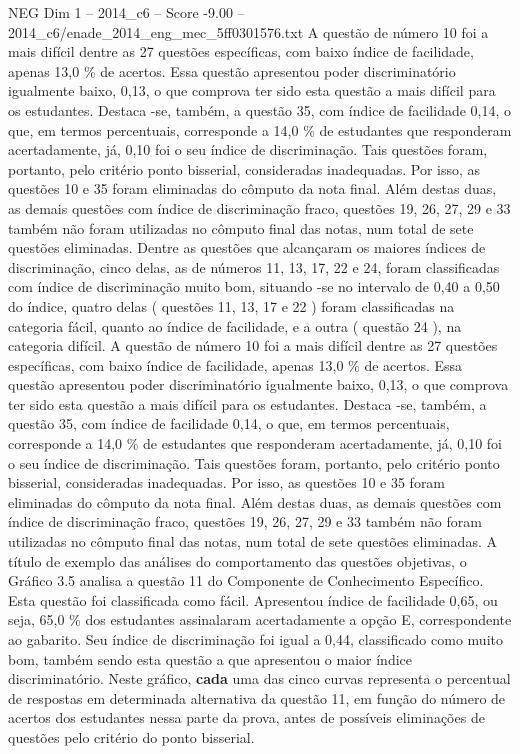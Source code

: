 \begin{textsample}{NEG Dim 1 – 2014\_c6 – Score -9.00 – 2014\_c6/enade\_2014\_eng\_mec\_5ff0301576.txt}
A questão de número 10 foi a mais difícil dentre as 27 questões específicas, com baixo índice de facilidade, apenas 13,0 \% de acertos.
Essa questão apresentou poder discriminatório igualmente baixo, 0,13, o que comprova ter sido esta questão a mais difícil para os estudantes.
Destaca -se, também, a questão 35, com índice de facilidade 0,14, o que, em termos percentuais, corresponde a 14,0 \% de estudantes que responderam acertadamente, já, 0,10 foi o seu índice de discriminação.
Tais questões foram, portanto, pelo critério ponto bisserial, consideradas inadequadas.
Por isso, as questões 10 e 35 foram eliminadas do cômputo da nota final.
Além destas duas, as demais questões com índice de discriminação fraco, questões 19, 26, 27, 29 e 33 também não foram utilizadas no cômputo final das notas, num total de sete questões eliminadas.
Dentre as questões que alcançaram os maiores índices de discriminação, cinco delas, as de números 11, 13, 17, 22 e 24, foram classificadas com índice de discriminação muito bom, situando -se no intervalo de 0,40 a 0,50 do índice, quatro delas ( questões 11, 13, 17 e 22 ) foram classificadas na categoria fácil, quanto ao índice de facilidade, e a outra ( questão 24 ), na categoria difícil.
A questão de número 10 foi a mais difícil dentre as 27 questões específicas, com baixo índice de facilidade, apenas 13,0 \% de acertos.
Essa questão apresentou poder discriminatório igualmente baixo, 0,13, o que comprova ter sido esta questão a mais difícil para os estudantes.
Destaca -se, também, a questão 35, com índice de facilidade 0,14, o que, em termos percentuais, corresponde a 14,0 \% de estudantes que responderam acertadamente, já, 0,10 foi o seu índice de discriminação.
Tais questões foram, portanto, pelo critério ponto bisserial, consideradas inadequadas.
Por isso, as questões 10 e 35 foram eliminadas do cômputo da nota final.
Além destas duas, as demais questões com índice de discriminação fraco, questões 19, 26, 27, 29 e 33 também não foram utilizadas no cômputo final das notas, num total de sete questões eliminadas.
A título de exemplo das análises do comportamento das questões objetivas, o Gráfico 3.5 analisa a questão 11 do Componente de Conhecimento Específico.
Esta questão foi classificada como fácil.
Apresentou índice de facilidade 0,65, ou seja, 65,0 \% dos estudantes assinalaram acertadamente a opção E, correspondente ao gabarito.
Seu índice de discriminação foi igual a 0,44, classificado como muito bom, também sendo esta questão a que apresentou o maior índice discriminatório.
Neste gráfico, \textbf{cada} uma das cinco curvas representa o percentual de respostas em determinada alternativa da questão 11, em função do número de acertos dos estudantes nessa parte da prova, antes de possíveis eliminações de questões pelo critério do ponto bisserial.

\end{textsample}
